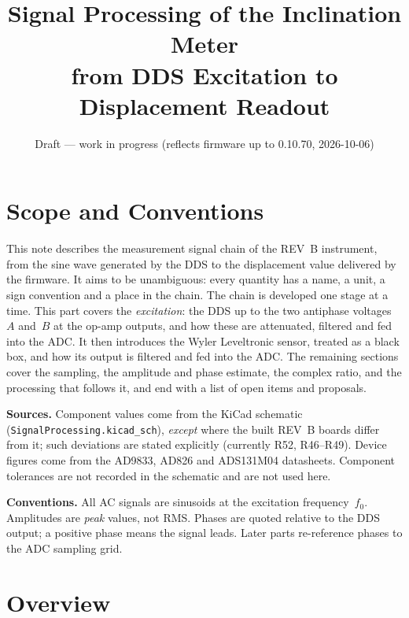 \documentclass[11pt,a4paper]{article}
\title{Signal Processing of the Inclination Meter\\
       from DDS Excitation to Displacement Readout}
\author{}
\date{Draft --- work in progress (reflects firmware up to 0.10.70, 2026-10-06)}
\begin{document}
\maketitle
\tableofcontents
\bigskip

\section{Scope and Conventions}

This note describes the measurement signal chain of the REV~B instrument,
from the sine wave generated by the DDS to the displacement value delivered
by the firmware.  It aims to be unambiguous: every quantity has a name, a
unit, a sign convention and a place in the chain.  The chain is developed
one stage at a time.  This part covers the \emph{excitation}: the DDS up to
the two antiphase voltages~$A$ and~$B$ at the op-amp outputs, and how these
are attenuated, filtered and fed into the ADC.  It then introduces the Wyler
Leveltronic sensor, treated as a black box, and how its output is filtered
and fed into the ADC.  The remaining sections cover the sampling, the
amplitude and phase estimate, the complex ratio, and the processing that
follows it, and end with a list of open items and proposals.

\textbf{Sources.}  Component values come from the KiCad schematic
(\texttt{SignalProcessing.kicad\_sch}), \emph{except} where the built REV~B
boards differ from it; such deviations are stated explicitly (currently R52,
R46--R49).  Device figures come from the AD9833, AD826 and ADS131M04
datasheets.  Component
tolerances are not recorded in the schematic and are not used here.

\textbf{Conventions.}  All AC signals are sinusoids at the excitation
frequency~$f_0$.  Amplitudes are \emph{peak} values, not RMS.  Phases are
quoted relative to the DDS output; a positive phase means the signal leads.
Later parts re-reference phases to the ADC sampling grid.

\section{Overview}
\end{document}
